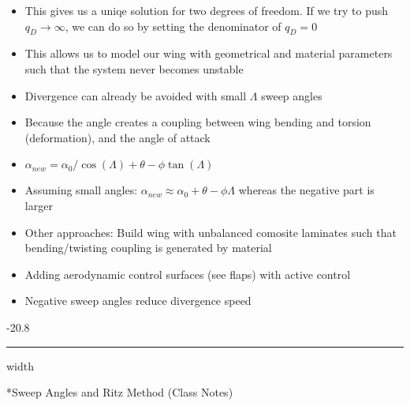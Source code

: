 \documentclass[8pt, landscape, fleqn]{scrartcl}
\makeatletter
\renewcommand{\subsubsection}{\@startsection{subsubsection}{1}{0mm}%
{-2\baselineskip}{0.8\baselineskip}%
{\hrule depth 0.2pt width\columnwidth\vspace*{1.2em}\normalsize\bfseries\rmfamily}}
\makeatother
\begin{document}
\begin{multicols*}{3}
\begin{itemize}
    \item This gives us a uniqe solution for two degrees of freedom. If we try to push $q_D \rightarrow \infty$, we can do so by setting the denominator of $q_D = 0$
    \item This allows us to model our wing with geometrical and material parameters such that the system never becomes unstable
    \item Divergence can already be avoided with small $\Lambda$ sweep angles
    \item Because the angle creates a coupling between wing bending and torsion (deformation), and the angle of attack
    \item $\alpha_{new} = \alpha_0 / \cos(\Lambda) + \theta - \phi \tan(\Lambda)$ 
    \item Assuming small angles: $\alpha_{new} \approx \alpha_0 + \theta - \phi \Lambda$ whereas the negative part is larger
    \item Other approaches: Build wing with unbalanced comosite laminates such that bending/twisting coupling is generated by material
    \item Adding aerodynamic control surfaces (see flaps) with active control
    \item Negative sweep angles reduce divergence speed
\end{itemize}

\subsubsection*{Sweep Angles and Ritz Method (Class Notes)}


\end{multicols*}
\end{document}
